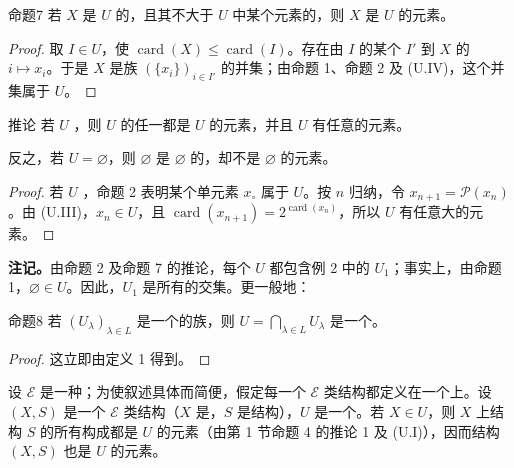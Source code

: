 \begin{SGAresult}{命题}{7}
若 $X$ 是 $U$ 的，且其不大于 $U$ 中某个元素的，则 $X$ 是 $U$ 的元素。
\end{SGAresult}
\begin{proof}
取 $I\in U$，使 $\operatorname{card}(X)\leq\operatorname{card}(I)$。存在由 $I$ 的某个 $I'$ 到 $X$ 的 $i\mapsto x_i$。于是 $X$ 是族 $(\{x_i\})_{i\in I'}$ 的并集；由命题 1、命题 2 及 (U.IV)，这个并集属于 $U$。
\end{proof}
\begin{SGAresult}{推论}{}
若 $U$ ，则 $U$ 的任一都是 $U$ 的元素，并且 $U$ 有任意的元素。
\end{SGAresult}
反之，若 $U=\varnothing$，则 $\varnothing$ 是 $\varnothing$ 的，却不是 $\varnothing$ 的元素。
\begin{proof}
若 $U$ ，命题 2 表明某个单元素 $x_\circ$ 属于 $U$。按 $n$ 归纳，令 $x_{n+1}=\mathcal P(x_n)$。由 (U.III)，$x_n\in U$，且 $\operatorname{card}(x_{n+1})=2^{\operatorname{card}(x_n)}$，所以 $U$ 有任意大的元素。
\end{proof}
\textbf{注记。}由命题 2 及命题 7 的推论，每个 $U$ 都包含例 2 中的 $U_1$；事实上，由命题 1，$\varnothing\in U$。因此，$U_1$ 是所有的交集。更一般地：
\begin{SGAresult}{命题}{8}
若 $(U_\lambda)_{\lambda\in L}$ 是一个的族，则 $U=\bigcap_{\lambda\in L}U_\lambda$ 是一个。
\end{SGAresult}
\begin{proof}
这立即由定义 1 得到。
\end{proof}

设 $\mathscr E$ 是一种；为使叙述具体而简便，假定每一个 $\mathscr E$ 类结构都定义在一个上。设 $(X,S)$ 是一个 $\mathscr E$ 类结构（$X$ 是，$S$ 是结构），$U$ 是一个。若 $X\in U$，则 $X$ 上结构 $S$ 的所有构成都是 $U$ 的元素（由第 1 节命题 4 的推论 1 及 (U.I)），因而结构 $(X,S)$ 也是 $U$ 的元素。

